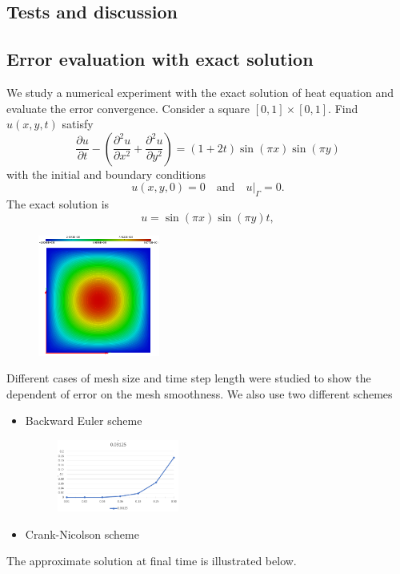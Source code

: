\documentclass[notitlepage,a4paper,fleqn,9pt]{icmfarticle}
\begin{document}
\begin{multicols}{2}
\section{Tests and discussion}
\subsection{Error evaluation with exact solution}
We study a numerical experiment with the exact solution of heat equation and evaluate the error convergence. Consider a square $[0,1]\times[0,1]$. Find $u(x,y,t)$ satisfy
\begin{equation}
\dfrac{\partial u}{\partial t} - \left(\dfrac{\partial^2 u}{\partial x^2} + \dfrac{\partial^2u}{\partial y^2}\right) = (1+2t)\sin(\pi x) \sin(\pi y)
\end{equation}
with the initial and boundary conditions
$$
u(x,y,0) = 0 \quad \text{and} \quad u|_\Gamma = 0.
$$
The exact solution is
$$
u = \sin(\pi x) \sin(\pi y) t,
$$
\begin{figure}[h!]
	\centering
	\includegraphics[width=4cm]{direct}
\end{figure}
Different cases of mesh size and time step length were studied to show the dependent of error on the mesh smoothness. We also use two different schemes
\begin{itemize}
	\item Backward Euler scheme
	\begin{figure}[h!]
		\centering
		\includegraphics[width=4cm]{graph}
	\end{figure}
	\item Crank-Nicolson scheme
\end{itemize}
The approximate solution at final time is illustrated below.

\end{multicols}
\end{document}
